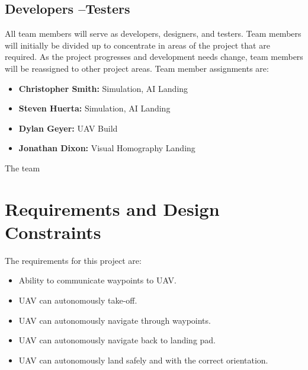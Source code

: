 \subsection{Developers --Testers}
All team members will serve as developers, designers, and testers. Team members will initially be divided up to concentrate in areas of the project that are required. As the project progresses and development needs change, team members will be reassigned to other project areas. Team member assignments are:
\begin{itemize}
\item \textbf{Christopher Smith:} Simulation, AI Landing
\item \textbf{Steven Huerta:} Simulation, AI Landing
\item \textbf{Dylan Geyer:} UAV Build
\item \textbf{Jonathan Dixon:} Visual Homography Landing
\end{itemize}
\noindent The team 


\section{Requirements and Design Constraints}
The requirements for this project are:
\begin{itemize}
\item Ability to communicate waypoints to UAV.
\item UAV can autonomously take-off.
\item UAV can autonomously navigate through waypoints.
\item UAV can autonomously navigate back to landing pad.
\item UAV can autonomously land safely and with the correct orientation.
\end{itemize}

